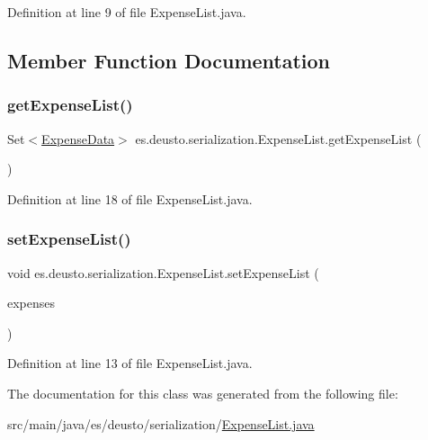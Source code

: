 Definition at line 9 of file Expense\+List.\+java.



\subsection{Member Function Documentation}
\mbox{\label{classes_1_1deusto_1_1serialization_1_1_expense_list_aa54bbdc7fde1b0c4f6be8e5af053f4c4}} 
\subsubsection{\texorpdfstring{get\+Expense\+List()}{getExpenseList()}}
{\footnotesize\ttfamily Set$<$\hyperlink{classes_1_1deusto_1_1serialization_1_1_expense_data}{Expense\+Data}$>$ es.\+deusto.\+serialization.\+Expense\+List.\+get\+Expense\+List (\begin{DoxyParamCaption}{ }\end{DoxyParamCaption})}



Definition at line 18 of file Expense\+List.\+java.

\mbox{\label{classes_1_1deusto_1_1serialization_1_1_expense_list_a0ab9d9c259b8a4bcb1a1891f8ea85520}} 
\subsubsection{\texorpdfstring{set\+Expense\+List()}{setExpenseList()}}
{\footnotesize\ttfamily void es.\+deusto.\+serialization.\+Expense\+List.\+set\+Expense\+List (\begin{DoxyParamCaption}\item[{Set$<$ \hyperlink{classes_1_1deusto_1_1serialization_1_1_expense_data}{Expense\+Data} $>$}]{expenses }\end{DoxyParamCaption})}



Definition at line 13 of file Expense\+List.\+java.



The documentation for this class was generated from the following file\+:\begin{DoxyCompactItemize}
\item 
src/main/java/es/deusto/serialization/\hyperlink{_expense_list_8java}{Expense\+List.\+java}\end{DoxyCompactItemize}
